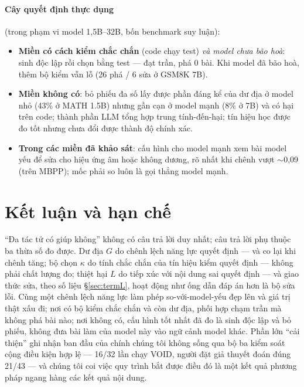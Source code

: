 \documentclass[12pt,a4paper]{article}
\begin{document}
\paragraph{Cây quyết định thực dụng} (trong phạm vi model 1,5B--32B, bốn benchmark suy luận):
\begin{itemize}\itemsep2pt
\item \textbf{Miền có cách kiểm chắc chắn} (code chạy test) \emph{và model chưa bão hoà}: sinh
      độc lập rồi chọn bằng test --- đạt trần, phá 0 bài. Khi model đã bão hoà, thêm bộ kiểm
      vẫn lỗ (26 phá / 6 sửa ở GSM8K 7B).
\item \textbf{Miền không có}: bỏ phiếu đa số lấy được phần đáng kể của dư địa ở model nhỏ
      (43\% ở MATH 1.5B) nhưng gần cạn ở model mạnh (8\% ở 7B) và có hại trên code; thành phần
      LLM tổng hợp trung tính-đến-hại; tín hiệu học được đo tốt nhưng chưa đổi được thành độ
      chính xác.
\item \textbf{Trong các miền đã khảo sát}: cấu hình cho model mạnh xem bài model yếu để sửa cho
      hiệu ứng âm hoặc không dương, rõ nhất khi chênh vượt $\sim$0,09 (trên MBPP); mốc phải so
      luôn là gọi thẳng model mạnh.
\end{itemize}

\section{Kết luận và hạn chế}\label{sec:limits}

``Đa tác tử có giúp không'' không có câu trả lời duy nhất; câu trả lời phụ thuộc ba thừa số đo
được. Dư địa $G$ do chênh lệch năng lực quyết định --- và co lại khi chênh tăng; bộ chọn
$\kappa$ do tính chắc chắn của tín hiệu kiểm quyết định --- không phải chất lượng đo; thiệt hại
$L$ do tiếp xúc với nội dung sai quyết định --- và giao thức sửa, theo số liệu
\S\ref{sec:termL}, hoạt động như ống dẫn đáp án hơn là bộ sửa lỗi. Cùng một chênh lệch năng lực
làm phép so-với-model-yếu đẹp lên và giá trị thật xấu đi; nơi có bộ kiểm chắc chắn và còn dư
địa, phối hợp chạm trần mà không phá bài nào; nơi không có, cấu hình tốt nhất đã đo là sinh độc
lập và bỏ phiếu, không đưa bài làm của model này vào ngữ cảnh model khác. Phần lớn ``cải
thiện'' ghi nhận ban đầu của chính chúng tôi không sống qua bộ ba kiểm soát cộng điều kiện hợp
lệ --- 16/32 lần chạy VOID, người đặt giả thuyết đoán đúng 21/43 --- và chúng tôi coi việc quy
trình bắt được điều đó là một kết quả phương pháp ngang hàng các kết quả nội dung.
\end{document}
